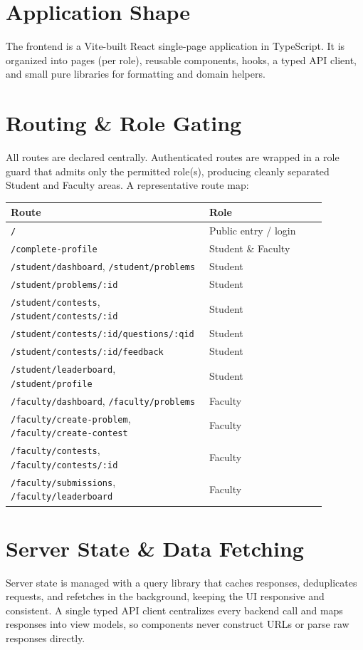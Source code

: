 \documentclass[12pt,a4paper,oneside]{report}
\newcommand{\code}[1]{\texttt{#1}}
\begin{document}
\section{Application Shape}
The frontend is a Vite-built React single-page application in TypeScript. It is
organized into pages (per role), reusable components, hooks, a typed API client,
and small pure libraries for formatting and domain helpers.

\section{Routing \& Role Gating}
All routes are declared centrally. Authenticated routes are wrapped in a role
guard that admits only the permitted role(s), producing cleanly separated Student
and Faculty areas. A representative route map:

\begin{longtable}{@{}p{0.52\linewidth} p{0.36\linewidth}@{}}
\toprule
\textbf{Route} & \textbf{Role}\\
\midrule
\endhead
\code{/} & Public entry / login\\
\code{/complete-profile} & Student \& Faculty\\
\code{/student/dashboard}, \code{/student/problems} & Student\\
\code{/student/problems/:id} & Student\\
\code{/student/contests}, \code{/student/contests/:id} & Student\\
\code{/student/contests/:id/questions/:qid} & Student\\
\code{/student/contests/:id/feedback} & Student\\
\code{/student/leaderboard}, \code{/student/profile} & Student\\
\code{/faculty/dashboard}, \code{/faculty/problems} & Faculty\\
\code{/faculty/create-problem}, \code{/faculty/create-contest} & Faculty\\
\code{/faculty/contests}, \code{/faculty/contests/:id} & Faculty\\
\code{/faculty/submissions}, \code{/faculty/leaderboard} & Faculty\\
\bottomrule
\end{longtable}

\section{Server State \& Data Fetching}
Server state is managed with a query library that caches responses, deduplicates
requests, and refetches in the background, keeping the UI responsive and
consistent. A single typed API client centralizes every backend call and maps
responses into view models, so components never construct URLs or parse raw
responses directly.
\end{document}
